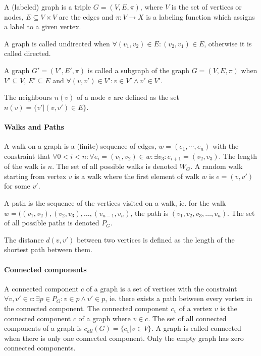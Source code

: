 

A (labeled) graph is a triple $G = (V, E, \pi)$, where $V$ is the set of vertices or nodes, $E \subseteq V \times V$ are the edges and $\pi: V \to X$ is a labeling function which assigns a label to a given vertex.

A graph is called undirected when $\forall (v_1, v_2) \in E: (v_2, v_1) \in E$, otherwise it is called directed.

A graph $G'=(V', E', \pi)$ is called a subgraph of the graph $G = (V, E, \pi)$ when $V' \subseteq V$, $E' \subseteq E$ and $\forall (v, v') \in V': v \in V' \land v' \in V'$.

The neighbours $n(v)$ of a node $v$ are defined as the set $n(v) = \{v' | (v, v') \in E \}$.

\paragraph{Walks and Paths}
A walk on a graph is a (finite) sequence of edges, $w = (e_1, \cdots, e_n)$ with the constraint that $\forall 0 < i < n: \forall e_i = (v_1, v_2) \in w: \exists v_3: e_{i + 1} = (v_2, v_3)$. The length of the walk is $n$.
The set of all possible walks is denoted $W_G$.
A random walk starting from vertex $v$ is a walk where the first element of walk $w$ is $e = (v, v')$ for some $v'$.

A path is the sequence of the vertices visited on a walk, ie. for the walk $w = ((v_1, v_2), (v_2, v_3), \dots, (v_{n-1}, v_n)$, the path is $(v_1, v_2, v_3, \dots, v_n)$.
The set of all possible paths is denoted $P_G$.

The distance $d(v, v')$ between two vertices is defined as the length of the shortest path between them.

\paragraph{Connected components}
A connected component $c$ of a graph is a set of vertices with the constraint $\forall v, v' \in c: \exists p \in P_G: v \in p \land v' \in p$, ie. there exists a path between every vertex in the connected component.
The connected component $c_v$ of a vertex $v$ is the connected component $c$ of a graph where $v \in c$.
The set of all connected components of a graph is $c_{all}(G) = \{ c_v | v \in V \}$. A graph is called connected when there is only one connected component. Only the empty graph has zero connected components.


